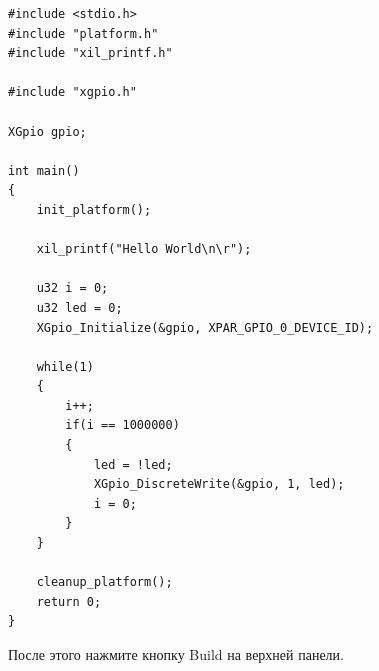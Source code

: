\documentclass[a4paper,oneside ,14pt]{extreport}
\begin{document}
\begin{Verbatim}[tabsize=4]
#include <stdio.h>
#include "platform.h"
#include "xil_printf.h"

#include "xgpio.h"

XGpio gpio;

int main()
{
    init_platform();

    xil_printf("Hello World\n\r");

    u32 i = 0;
    u32 led = 0;
    XGpio_Initialize(&gpio, XPAR_GPIO_0_DEVICE_ID);

    while(1)
    {
    	i++;
    	if(i == 1000000)
    	{
    		led = !led;
    		XGpio_DiscreteWrite(&gpio, 1, led);
       		i = 0;
    	}
    }

    cleanup_platform();
    return 0;
}
\end{Verbatim}

После этого нажмите кнопку Build на верхней панели. 
\end{document}
